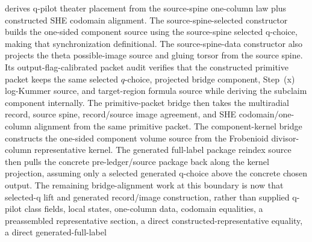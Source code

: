 \begin{proposition}
  derives q-pilot theater placement from the source-spine one-column law plus
  constructed SHE codomain alignment.  The source-spine-selected constructor
  builds the one-sided component source using the source-spine selected
  q-choice, making that synchronization definitional.  The source-spine-data
  constructor
  also projects the theta possible-image source and gluing torsor from the
  source spine.  Its output-flag-calibrated packet audit verifies that the
  constructed primitive packet keeps the same selected \(q\)-choice, projected
  bridge component, Step~(x) log-Kummer source, and target-region formula source
  while deriving the subclaim component internally.  The primitive-packet bridge
  then takes the multiradial record, source spine, record/source image
  agreement, and SHE codomain/one-column alignment from the same primitive
  packet.  The component-kernel bridge
  constructs the one-sided component volume source from the Frobenioid
  divisor-column representative kernel.  The generated full-label package
  reindex source then pulls the concrete pre-ledger/source package back along
  the kernel projection, assuming only a selected generated q-choice above the
  concrete chosen output.  The remaining bridge-alignment work at this boundary
  is now that selected-q lift and generated record/image construction, rather
  than supplied q-pilot class fields, local states, one-column data, codomain
  equalities, a preassembled representative section, a direct
  constructed-representative equality, a direct generated-full-label

\end{proposition}
